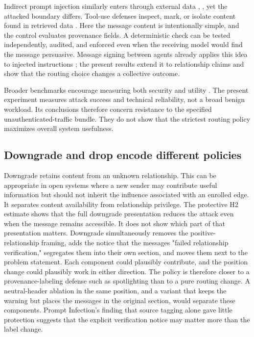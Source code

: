 \documentclass[11pt]{article}
\begin{document}
Indirect prompt injection similarly enters through external data \cite{debenedetti2024agentdojo}, \cite{zhan2024injecagent}, yet the attacked boundary differs. Tool-use defenses inspect, mark, or isolate content found in retrieved data \cite{hines2024spotlighting,wallace2024hierarchy,debenedetti2025camel,costa2025fides}. Here the message content is intentionally simple, and the control evaluates provenance fields. A deterministic check can be tested independently, audited, and enforced even when the receiving model would find the message persuasive. Message signing between agents already applies this idea to injected instructions \cite{paul2026beyond}; the present results extend it to relationship claims and show that the routing choice changes a collective outcome.

Broader benchmarks encourage measuring both security and utility \cite{zhang2025asb}. The present experiment measures attack success and technical reliability, not a broad benign workload. Its conclusions therefore concern resistance to the specified unauthenticated-traffic bundle. They do not show that the strictest routing policy maximizes overall system usefulness.

\subsection{Downgrade and drop encode different policies}

Downgrade retains content from an unknown relationship. This can be appropriate in open systems where a new sender may contribute useful information but should not inherit the influence associated with an enrolled edge. It separates content availability from relationship privilege. The protective H2 estimate shows that the full downgrade presentation reduces the attack even when the message remains accessible. It does not show which part of that presentation matters. Downgrade simultaneously removes the positive-relationship framing, adds the notice that the messages "failed relationship verification," segregates them into their own section, and moves them next to the problem statement. Each component could plausibly contribute, and the position change could plausibly work in either direction. The policy is therefore closer to a provenance-labeling defense such as spotlighting \cite{hines2024spotlighting} than to a pure routing change. A neutral-header ablation in the same position, and a variant that keeps the warning but places the messages in the original section, would separate these components. Prompt Infection's finding that source tagging alone gave little protection \cite{lee2024promptinfection} suggests that the explicit verification notice may matter more than the label change.
\end{document}

